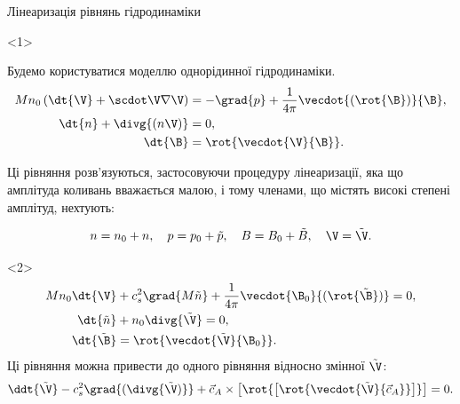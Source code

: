 \documentclass[]{beamer}
\begin{document}
\begin{frame}{Лінеаризація рівнянь гідродинаміки}{}
	\begin{onlyenv}
		\begin{block}{}\justifying

			Будемо користуватися моделлю однорідинної гідродинаміки.
			\begin{align*}
				Mn_0 \left(\dt{\V} + \scdot\V\nabla \V\right) & = - \grad{p} + \frac1{4\pi}\vecdot{(\rot{\B})}{\B}, \\
				\dt{n} + \divg{(n\V)}                         & = 0,                                                \\
				\dt{\B}                                       & = \rot{\vecdot{\V}{\B}}.
			\end{align*}

			Ці рівняння розв'язуються, застосовуючи \alert{процедуру лінеаризації}, яка що амплітуда коливань
			вважається малою, і тому членами, що містять високі степені амплітуд, нехтують:

			\begin{equation*}
				n = n_0 + n,  \quad p = p_0 + \tilde{p}, \quad B  = B_0 + \tilde{B}, \quad \V =  \tilde{\V}.
			\end{equation*}
		\end{block}
	\end{onlyenv}
	\begin{onlyenv}
		\begin{align*}
			Mn_0 \dt{\V}    & + c_s^2\grad{M\tilde{n}}   + \frac1{4\pi}\vecdot{\B_0}{(\rot{\tilde{\B}})} = 0, \\
			\dt{\tilde{n}}  & + n_0 \divg{\tilde{\V}}  = 0,                                                   \\
			\dt{\tilde{\B}} & = \rot{\vecdot{\tilde{\V}}{\B_0}}.
		\end{align*}
		Ці рівняння можна привести до одного рівняння відносно змінної $\tilde{\V}$:
		\begin{equation*}
			\ddt{\tilde{\V}} - c_s^2\grad{(\divg{\tilde{\V})}} +
			\vec{c}_A\times\left[\rot{\left[\rot{\vecdot{\tilde{\V}}{\vec{c}_A}}\right]}\right] = 0.
		\end{equation*}
	\end{onlyenv}
\end{frame}
\end{document}
